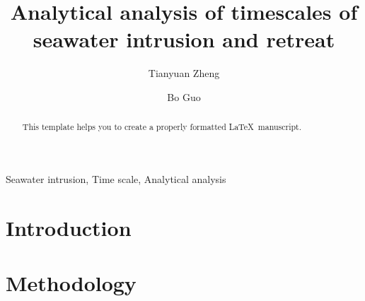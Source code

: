 \documentclass[review]{elsarticle}
\begin{document}
\begin{frontmatter}

\title{Analytical analysis of timescales of seawater intrusion and retreat}

\author[label1,label2]{Tianyuan Zheng}
\author[label3]{Bo Guo}
\address[label1]{Department of Environmental Informatics, Helmholtz Centre for Environmental Research - UFZ, Permoserstra{\ss}e 15, 04318 Leipzig, Germany}
\address[label2]{Applied Environmental Systems Analysis, Dresden University of Technology, Germany}
\address[label3]{Civil and Environmental Engineering, Princeton University, NJ, US, 08544}




\begin{abstract}
This template helps you to create a properly formatted \LaTeX\ manuscript.
\end{abstract}

\begin{keyword}
Seawater intrusion, Time scale, Analytical analysis
\end{keyword}

\end{frontmatter}

\linenumbers

\section{Introduction}

\section{Methodology}
\end{document}
